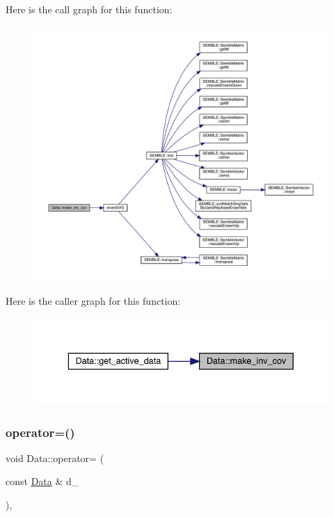 Here is the call graph for this function\+:
\nopagebreak
\begin{figure}[H]
\begin{center}
\leavevmode
\includegraphics[width=350pt]{d0/df3/classData_a39cfb18f88b5b75d640404d87b428820_cgraph}
\end{center}
\end{figure}
Here is the caller graph for this function\+:
\nopagebreak
\begin{figure}[H]
\begin{center}
\leavevmode
\includegraphics[width=336pt]{d0/df3/classData_a39cfb18f88b5b75d640404d87b428820_icgraph}
\end{center}
\end{figure}
\mbox{\label{classData_a4af8ede7697476321f80686ca5576228}} 
\subsubsection{\texorpdfstring{operator=()}{operator=()}\hspace{0.1cm}{\footnotesize\ttfamily [1/2]}}
{\footnotesize\ttfamily void Data\+::operator= (\begin{DoxyParamCaption}\item[{const \mbox{\hyperlink{classData}{Data}} \&}]{d\+\_\+ }\end{DoxyParamCaption})\hspace{0.3cm}{\ttfamily [inline]}, {\ttfamily [protected]}}

